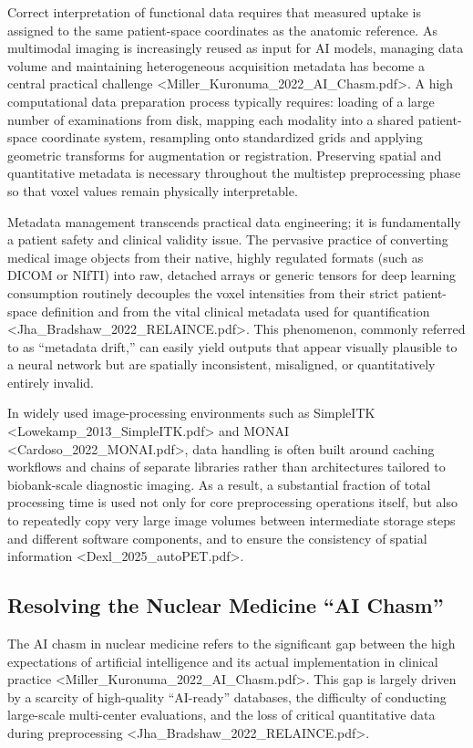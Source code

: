 \documentclass[10pt,letterpaper]{article}
\begin{document}
Correct interpretation of functional data requires that measured uptake is assigned to the same patient-space coordinates as the anatomic reference. As multimodal imaging is increasingly reused as input for AI models, managing data volume and maintaining heterogeneous acquisition metadata has become a central practical challenge <Miller_Kuronuma_2022_AI_Chasm.pdf>. A high computational data preparation process typically requires: loading of a large number of examinations from disk, mapping each modality into a shared patient-space coordinate system, resampling onto standardized grids and applying geometric transforms for augmentation or registration. Preserving spatial and quantitative metadata is necessary throughout the multistep preprocessing phase so that voxel values remain physically interpretable. 

Metadata management transcends practical data engineering; it is fundamentally a patient safety and clinical validity issue. The pervasive practice of converting medical image objects from their native, highly regulated formats (such as DICOM or NIfTI) into raw, detached arrays or generic tensors for deep learning consumption routinely decouples the voxel intensities from their strict patient-space definition and from the vital clinical metadata used for quantification <Jha_Bradshaw_2022_RELAINCE.pdf>. This phenomenon, commonly referred to as ``metadata drift,'' can easily yield outputs that appear visually plausible to a neural network but are spatially inconsistent, misaligned, or quantitatively entirely invalid.

In widely used image-processing environments such as SimpleITK <Lowekamp_2013_SimpleITK.pdf> and MONAI <Cardoso_2022_MONAI.pdf>, data handling is often built around caching workflows and chains of separate libraries rather than architectures tailored to biobank-scale diagnostic imaging. As a result, a substantial fraction of total processing time is used not only for core preprocessing operations itself, but also to repeatedly copy very large image volumes between intermediate storage steps and different software components, and to ensure the consistency of spatial information <Dexl_2025_autoPET.pdf>.

\subsection*{Resolving the Nuclear Medicine ``AI Chasm''}
The AI chasm in nuclear medicine refers to the significant gap between the high expectations of artificial intelligence and its actual implementation in clinical practice <Miller_Kuronuma_2022_AI_Chasm.pdf>. This gap is largely driven by a scarcity of high-quality ``AI-ready'' databases, the difficulty of conducting large-scale multi-center evaluations, and the loss of critical quantitative data during preprocessing <Jha_Bradshaw_2022_RELAINCE.pdf>.
\end{document}
